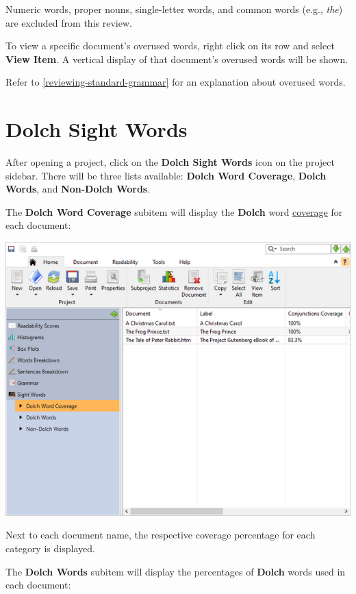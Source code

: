 \documentclass[
]{book}
\theoremstyle{definition}
\theoremstyle{definition}
\theoremstyle{definition}
\theoremstyle{definition}
\theoremstyle{remark}
\begin{document}
Numeric words, proper nouns, single-letter words, and common words (e.g., \emph{the}) are excluded from this review.

To view a specific document's overused words, right click on its row and select \textbf{View Item}. A vertical display of that document's overused words will be shown.

Refer to \ref{reviewing-standard-grammar} for an explanation about overused words.

\hypertarget{reviewing-batch-dolch}{%
\section{Dolch Sight Words}\label{reviewing-batch-dolch}}

After opening a project, click on the \textbf{Dolch Sight Words} icon on the project sidebar. There will be three lists available: \textbf{Dolch Word Coverage}, \textbf{Dolch Words}, and \textbf{Non-Dolch Words}.

The \textbf{Dolch Word Coverage} subitem will display the \textbf{Dolch} word \protect\hyperlink{reviewing-dolch}{coverage} for each document:

\includegraphics{Images/batchdolchcoverage.png}

Next to each document name, the respective coverage percentage for each category is displayed.

The \textbf{Dolch Words} subitem will display the percentages of \textbf{Dolch} words used in each document:
\end{document}
